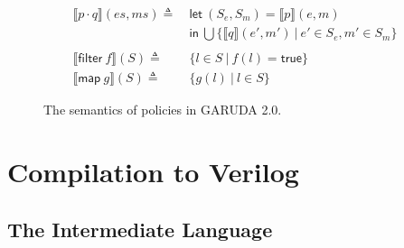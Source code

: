 \documentclass[12pt, letterpaper]{article}
\newcommand\interp[1]{\llbracket #1 \rrbracket}
\def \sysname {\textsc{GARUDA 2.0}\xspace}
\begin{document}
\begin{figure}
\begin{align*}
            \interp { p \cdot q }(\mathit{es}, \mathit{ms})
              \triangleq\ &
              \mathsf{let}\ (S_e, S_m) = \interp{p}(e, m)\\
              &\mathsf{in}\ \bigcup \{\interp{q}(\mathit{e}',\mathit{m}')\ |\ \mathit{e}'\in S_e, \mathit{m}'\in S_m\}\\
              \\
            \interp{\mathsf{filter}\ f}(S)
              \triangleq\ & \{l \in S\ |\ f(l) = \mathsf{true}\}\\
            \interp{\mathsf{map}\ g}(S)
              \triangleq\ &
              \{ g(l)\ |\ l\in S \} 
          \end{align*}
          \caption{The semantics of policies in \sysname.}
          \label{fig:spec:sem:pol}
        \end{figure}


  \clearpage
  \section{Compilation to Verilog}\label{sec:compile}
    \subsection{The Intermediate Language}\label{sec:compile:int}
\end{document}
